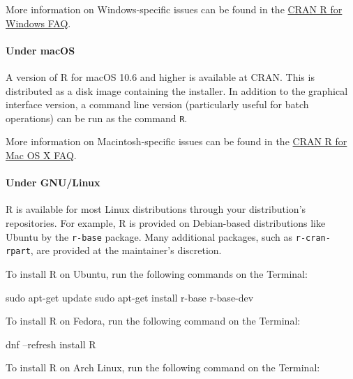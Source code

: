 \documentclass[]{scrartcl}
\newenvironment{Shaded}{\begin{snugshade}}{\end{snugshade}}
\newcommand{\ExtensionTok}[1]{#1}
\newcommand{\FunctionTok}[1]{\textcolor[rgb]{0.00,0.00,0.00}{#1}}
\newcommand{\NormalTok}[1]{#1}
\let\oldparagraph\paragraph
\renewcommand{\paragraph}[1]{\oldparagraph{#1}\mbox{}}
\begin{document}
More information on Windows-specific issues can be found in the \href{https://cloud.r-project.org/bin/windows/base/rw-FAQ.html}{CRAN R for Windows FAQ}.

\hypertarget{under-macos}{%
\paragraph{Under macOS}\label{under-macos}}

A version of R for macOS 10.6 and higher is available at CRAN. This is distributed as a disk image containing the installer. In addition to the graphical interface version, a command line version (particularly useful for batch operations) can be run as the command \texttt{R}.

More information on Macintosh-specific issues can be found in the \href{https://cloud.r-project.org/bin/macosx/RMacOSX-FAQ.html}{CRAN R for Mac OS X FAQ}.

\hypertarget{under-gnulinux}{%
\paragraph{Under GNU/Linux}\label{under-gnulinux}}

R is available for most Linux distributions through your distribution's repositories. For example, R is provided on Debian-based distributions like Ubuntu by the \texttt{r-base} package. Many additional packages, such as \texttt{r-cran-rpart}, are provided at the maintainer's discretion.

To install R on Ubuntu, run the following commands on the Terminal:

\begin{Shaded}
\begin{Highlighting}[]
\FunctionTok{sudo}\NormalTok{ apt-get update}
\FunctionTok{sudo}\NormalTok{ apt-get install r-base r-base-dev}
\end{Highlighting}
\end{Shaded}

To install R on Fedora, run the following command on the Terminal:

\begin{Shaded}
\begin{Highlighting}[]
\ExtensionTok{dnf}\NormalTok{ --refresh install R}
\end{Highlighting}
\end{Shaded}

To install R on Arch Linux, run the following command on the Terminal:
\end{document}
